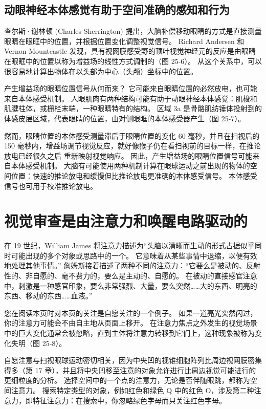 \subsection{动眼神经本体感觉有助于空间准确的感知和行为}
查尔斯·谢林顿 (Charles Sherrington) 提出，大脑补偿移动眼睛的方式是直接测量眼睛在眼眶中的位置，并根据位置变化调整视觉信号。 Richard Andersen 和 Vernon Mountcastle 发现，具有视网膜感受野的顶叶视觉神经元的反应是由眼睛在眼眶中的位置以称为增益场的线性方式调制的（图 25-6）。 从这个关系中，可以很容易地计算出物体在以头部为中心（头颅）坐标中的位置。

产生增益场的眼睛位置信号从何而来？ 它可能来自眼睛位置的必然放电，也可能来自本体感受机制。 人眼肌肉有两种结构可能有助于动眼神经本体感觉：肌梭和肌腱柱体，或栅栏末端，一种眼睛特有的结构。 区域 3a 是骨骼肌纺锤体投射到的体感皮层区域，代表眼睛的位置，由对侧眼眶的本体感受器产生（图 25-7）。

然而，眼睛位置的本体感受测量滞后于眼睛位置的变化 60 毫秒，并且在扫视后的 150 毫秒内，增益场调节视觉反应，就好像猴子仍在看扫视前的目标一样，在推论放电已经很久之后 重新映射视觉响应。 因此，产生增益场的眼睛位置信号可能来自本体感受机制。 大脑有可能使用两种机制计算在眼球运动之前出现的物体的空间位置：快速的推论放电和缓慢但比推论放电更准确的本体感受信号。 本体感受信号也可用于校准推论放电。


\section{视觉审查是由注意力和唤醒电路驱动的}
在 19 世纪，William James 将注意力描述为“头脑以清晰而生动的形式占据似乎同时可能出现的多个对象或思路中的一个。 它意味着从某些事情中退缩，以便有效地处理其他事情。” 詹姆斯接着描述了两种不同的注意力：“它要么是被动的、反射性的、非自愿的、毫不费力的，要么是主动的、自愿的。 在被动的直接感官注意中，刺激是一种感官印象，要么非常强烈、大量，要么突然……大的东西、明亮的东西、移动的东西……血液。”

您在阅读本页时对本页的关注是自愿关注的一个例子。 如果一道亮光突然闪过，你的注意力可能会不由自主地从页面上移开。 在注意力焦点之外发生的视觉场景中的巨大变化通常会被忽略，直到主体将注意力转移到它们上，这种现象被称为变化失明（图 25-8）。

自愿注意与扫视眼球运动密切相关，因为中央凹的视锥细胞阵列比周边视网膜密集得多（第 17 章），并且将中央凹移至注意的对象允许进行比周边视觉可能进行的更细粒度的分析。 选择空间中的一个点的注意力，无论是否伴随眼跳，都称为空间注意力。 搜索特定类型的对象，例如红色和绿色 Q 中的红色 O，涉及第二种注意力，即特征注意力：在搜索中，你忽略绿色字母而只关注红色字母。

